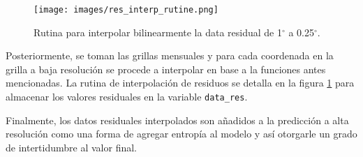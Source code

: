     \begin{figure}[H]
        \centering
              \texttt{[image: images/res\_interp\_rutine.png]}
              \vskip -0.1in
        \caption[Rutina de interpolación de residuos]{\footnotesize Rutina para interpolar bilinearmente la data residual de 1$^{\circ}$ a 0.25$^{\circ}$.}
        \label{logo5}
    \end{figure}

    Posteriormente, se toman las grillas mensuales y para cada coordenada en la grilla a baja resolución se procede a interpolar en base a la funciones antes mencionadas. La rutina de interpolación de residuos se detalla en la figura \ref{logo5} para almacenar los valores residuales en la variable \texttt{data\_res}.
    
    Finalmente, los datos residuales interpolados son añadidos a la predicción a alta resolución como una forma de agregar entropía al modelo y así otorgarle un grado de intertidumbre al valor final.



   